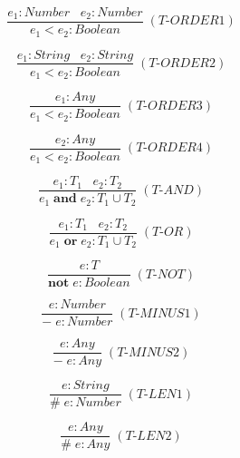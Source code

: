 \documentclass[12pt]{article}
\begin{document}
\[
\frac{e_{1}:Number \;\;\; e_{2}:Number}
     {e_{1} < e_{2} : Boolean} \; (\textit{T-ORDER1})
\]

\[
\frac{e_{1}:String \;\;\; e_{2}:String}
     {e_{1} < e_{2} : Boolean} \; (\textit{T-ORDER2})
\]

\[
\frac{e_{1}:Any}
     {e_{1} < e_{2} : Boolean} \; (\textit{T-ORDER3})
\]

\[
\frac{e_{2}:Any}
     {e_{1} < e_{2} : Boolean} \; (\textit{T-ORDER4})
\]

\[
\frac{e_{1}:T_{1} \;\;\; e_{2}:T_{2}}
     {e_{1} \; \textbf{and} \; e_{2} : T_{1} \cup T_{2}} \; (\textit{T-AND})
\]

\[
\frac{e_{1}:T_{1} \;\;\; e_{2}:T_{2}}
     {e_{1} \; \textbf{or} \; e_{2} : T_{1} \cup T_{2}} \; (\textit{T-OR})
\]

\[
\frac{e:T}
     {\textbf{not} \; e : Boolean} \; (\textit{T-NOT})
\]

\[
\frac{e:Number}
     {- \; e : Number} \; (\textit{T-MINUS1})
\]

\[
\frac{e:Any}
     {- \; e : Any} \; (\textit{T-MINUS2})
\]

\[
\frac{e : String}
     {\# \; e : Number} \; (\textit{T-LEN1})
\]

\[
\frac{e : Any}
     {\# \; e : Any} \; (\textit{T-LEN2})
\]
\end{document}
